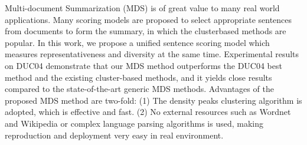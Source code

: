 Multi-document Summarization (MDS) is of great value to many real world applications. Many scoring models are proposed to select appropriate sentences from documents to form the summary, in which the clusterbased methods are popular. In this work, we propose a unified sentence scoring model which measures representativeness and diversity at the same time. Experimental results on DUC04 demonstrate that our MDS method outperforms the DUC04 best method and the existing cluster-based methods, and it yields close results compared to the state-of-the-art generic MDS methods. Advantages of the proposed MDS method are two-fold: (1) The density peaks clustering algorithm is adopted, which is effective and fast. (2) No external resources such as Wordnet and Wikipedia or complex language parsing algorithms is used, making reproduction and deployment very easy in real environment.
